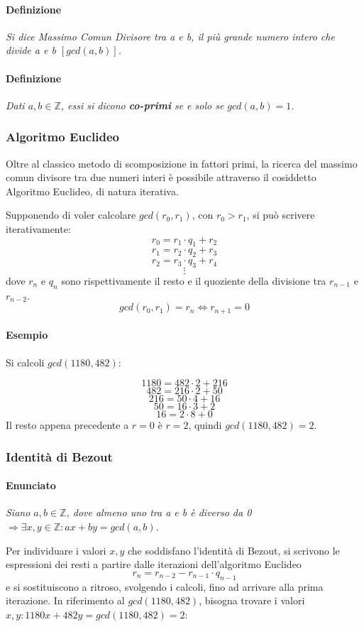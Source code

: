 \documentclass[12pt]{article}
\begin{document}
\paragraph{Definizione} \textit{Si dice Massimo Comun Divisore tra a e b, il più grande numero intero che divide a e b $[gcd(a,b)]$.}
\paragraph{Definizione} \textit{Dati $a,b\in \mathbb{Z}$, essi si dicono \textbf{co-primi} se e solo se $gcd(a,b)=1$.}
\subsubsection{Algoritmo Euclideo} Oltre al classico metodo di scomposizione in fattori primi, la ricerca del massimo comun divisore tra due numeri interi è possibile attraverso il cosiddetto Algoritmo Euclideo, di natura iterativa.

Supponendo di voler calcolare $gcd(r_0,r_1)$, con $r_0>r_1$, si può scrivere iterativamente:
$$r_0=r_1\cdot q_1 + r_2$$
$$r_1=r_2\cdot q_2 + r_3$$
$$r_2=r_3\cdot q_3 + r_4$$
$$\vdots$$
dove $r_n$ e $q_n$ sono rispettivamente il resto e il quoziente della divisione tra $r_{n-1}$ e $r_{n-2}$.
$$gcd(r_0,r_1)=r_n \Leftrightarrow r_{n+1}=0$$
\paragraph{Esempio}
Si calcoli $gcd(1180,482)$:

$$1180=482\cdot 2 + 216$$
$$482=216\cdot 2 + 50$$
$$216=50\cdot 4 + 16$$
$$50=16\cdot 3 + 2$$
$$16 = 2\cdot 8 + 0$$
Il resto appena precedente a $r=0$ è $r=2$, quindi $gcd(1180,482)=2$.
\subsubsection{Identità di Bezout}
\paragraph{Enunciato} \textit{Siano $a,b \in \mathbb{Z}$, dove almeno uno tra a e b è diverso da 0 $\Rightarrow \exists x,y \in \mathbb{Z}: ax+by=gcd(a,b)$.}

Per individuare i valori $x,y$ che soddisfano l'identità di Bezout, si scrivono le espressioni dei resti a partire dalle iterazioni dell'algoritmo Euclideo
$$r_n=r_{n-2}-r_{n-1}\cdot q_{n-1}$$
e si sostituiscono a ritroso, svolgendo i calcoli, fino ad arrivare alla prima iterazione. In riferimento al $gcd(1180,482)$, bisogna trovare i valori $x,y: 1180x+482y=gcd(1180,482)=2$:
\end{document}
